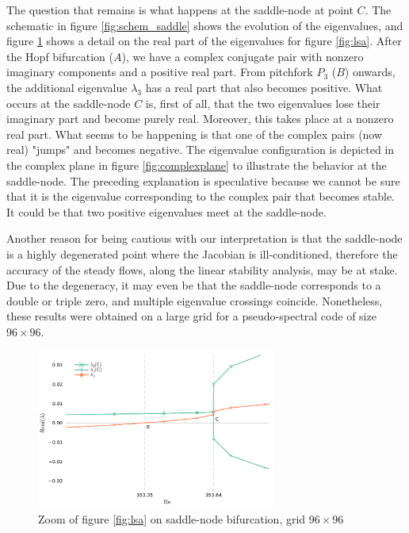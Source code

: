 The question that remains is what happens at the saddle-node at point $C$. The
schematic in figure \ref{fig:schem_saddle} shows the evolution of the
eigenvalues, and figure \ref{fig:lsa_zoom} shows a detail on the real part of
the eigenvalues for figure \ref{fig:lsa}. After the Hopf bifurcation ($A$), we
have a complex conjugate pair with nonzero imaginary components and a positive
real part. From pitchfork $P_3$ ($B$) onwards, the additional eigenvalue
$\lambda_3$ has a real part that also becomes positive. What occurs at the
saddle-node $C$ is, first of all, that the two eigenvalues lose their imaginary
part and become purely real. Moreover, this takes place at a nonzero real part.
What seems to be happening is that one of the complex pairs (now real) "jumps"
and becomes negative. The eigenvalue configuration is depicted in the complex
plane in figure \ref{fig:complexplane} to illustrate the behavior at the
saddle-node. The preceding explanation is speculative because we cannot be sure
that it is the eigenvalue corresponding to the complex pair that becomes
stable. It could be that two positive eigenvalues meet at the saddle-node.

Another reason for being cautious with our interpretation is that the
saddle-node is a highly degenerated point where the Jacobian is
ill-conditioned, therefore the accuracy of the steady flows, along the linear
stability analysis, may be at stake. Due to the degeneracy, it may even be that
the saddle-node corresponds to a double or triple zero, and multiple eigenvalue
crossings coincide. Nonetheless, these results were obtained on a large grid
for a pseudo-spectral code of size $96 \times 96$.

\begin{figure}[h!]
  \centering
  \includegraphics[width=0.7\textwidth]{figs/lsa_sn_zoom96x96.pdf}
  \caption{Zoom of figure \ref{fig:lsa} on saddle-node bifurcation, grid $96
    \times 96$} 
  \label{fig:lsa_zoom}
\end{figure}

